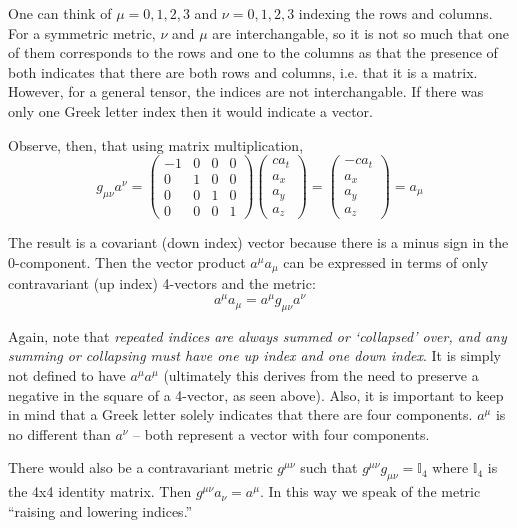 \documentclass[12pt]{revtex4}
\begin{document}
One can think of $\mu=0,1,2,3$ and $\nu=0,1,2,3$ indexing the rows and columns. For a symmetric metric, $\nu$ and $\mu$ are interchangable, so it is not so much that one of them corresponds to the rows and one to the columns as that the presence of both indicates that there are both rows and columns, i.e. that it is a matrix. However, for a general tensor, the indices are not interchangable. If there was only one Greek letter index then it would indicate a vector.

Observe, then, that using matrix multiplication,
\[ g_{\mu\nu}a^{\nu} = \begin{pmatrix}
-1 & 0 & 0 & 0 \\ 
0 & 1 & 0 & 0 \\ 
0 & 0 & 1 & 0 \\ 
0 & 0 & 0 & 1
\end{pmatrix} \begin{pmatrix}
ca_t \\ 
a_x \\ 
a_y \\ 
a_z 
\end{pmatrix} = \begin{pmatrix}
-ca_t \\ 
a_x \\ 
a_y \\ 
a_z 
\end{pmatrix} = a_{\mu} \]

The result is a covariant (down index) vector because there is a minus sign in the 0-component. Then the vector product $a^{\mu}a_{\mu}$ can be expressed in terms of only contravariant (up index) 4-vectors and the metric:
\[ a^{\mu}a_{\mu}= a^{\mu}g_{\mu\nu}a^{\nu} \]

Again, note that \textit{repeated indices are always summed or ‘collapsed’ over, and any summing or collapsing must have one up index and one down index}. It is simply not defined to have $a^{\mu}a^{\mu}$ (ultimately this derives from the need to preserve a negative in the square of a 4-vector, as seen above). Also, it is important to keep in mind that a Greek letter solely indicates that there are four components. $a^{\mu}$ is no different than $a^{\nu}$ – both represent a vector with four components.

There would also be a contravariant metric $g^{\mu\nu}$ such that $g^{\mu\nu}g_{\mu\nu}= \mathbb{I}_4$ where $\mathbb{I}_4$ is the 4x4 identity matrix. Then $g^{\mu\nu}a_{\nu}=a^{\mu}$. In this way we speak of the metric “raising and lowering indices.”
\end{document}
